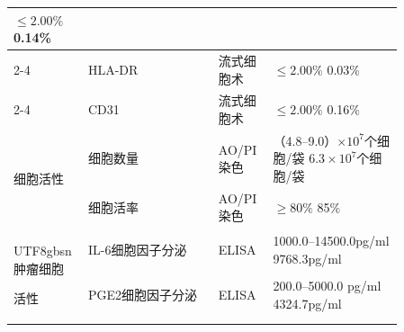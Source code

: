 \documentclass[UTF8,10pt,a4paper,fontset=fandol]{ctexart}
\newcommand{\fieldvalue}[1]{#1}
\begin{document}
\begin{center}
\begin{tabular}{|p{0.12\linewidth}|p{0.31\linewidth}|p{0.12\linewidth}|p{0.31\linewidth}|}
\fieldvalue{$\leq 2.00\%$}\quad
\fieldvalue{0.14\%}
\\ \cline{2-4}
&
\fieldvalue{HLA-DR} &
\fieldvalue{流式细胞术} &
\fieldvalue{$\leq 2.00\%$}\quad
\fieldvalue{0.03\%}
\\ \cline{2-4}
&
\fieldvalue{CD31} &
\fieldvalue{流式细胞术} &
\fieldvalue{$\leq 2.00\%$}\quad
\fieldvalue{0.16\%}
\\ \hline
\multirow{2}{*}{细胞活性}
&
\fieldvalue{细胞数量} &
\fieldvalue{AO/PI染色} &
\fieldvalue{（4.8--9.0）$\times10^{7}$个细胞/袋}\quad
\fieldvalue{$6.3\times10^{7}$个细胞/袋}
\\ \cline{2-4}
&
\fieldvalue{细胞活率} &
\fieldvalue{AO/PI染色} &
\fieldvalue{$\geq80\%$}\quad
\fieldvalue{85\%}
\\ \hline
\multirow{3}{*}{\begin{CJK*}{UTF8}{gbsn}肿瘤细胞\end{CJK*}活性}
&
\fieldvalue{IL-6细胞因子分泌} &
\fieldvalue{ELISA} &
\fieldvalue{1000.0--14500.0pg/ml}\quad
\fieldvalue{9768.3pg/ml}
\\ \cline{2-4}
&
\fieldvalue{PGE2细胞因子分泌} &
\fieldvalue{ELISA} &
\fieldvalue{200.0--5000.0 pg/ml}\quad
\fieldvalue{4324.7pg/ml}
\\ \cline{2-4}

\end{tabular}
\end{center}
\end{document}
